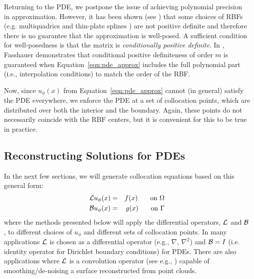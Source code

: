 \documentclass{report}
\begin{document}
{Returning to the PDE, we postpone the issue of  achieving polynomial precision in approximation. However, it has been shown (see \cite{Fasshauer2007, Iske2004}) that some choices of RBFs (e.g. multiquadrics and thin-plate splines \cite{Hon2001}) are not positive definite and therefore there is no guarantee that the approximation is well-posed. A sufficient condition for well-posedness is that the matrix is \emph{conditionally positive definite}. In \cite{Fasshauer2007}, Fasshauer demonstrates that conditional positive definiteness of order $m$ is guaranteed when Equation~\ref{eqn:pde_approx} includes the full polynomial part (i.e., interpolation conditions) to match the order of the RBF. 

Now, since $u_{\phi}(x)$ from Equation~\ref{eqn:pde_approx} cannot (in general) satisfy the PDE everywhere, we enforce the PDE at a set of collocation points, which are  distributed over both the interior and the boundary. Again, these points do not necessarily coincide with the RBF centers, but it is convenient for this to be true in practice. 

\subsection{Reconstructing Solutions for PDEs}
In the next few sections, we will generate collocation equations based on this general form: 
\begin{eqnarray}
\diffop{u_\phi(x)} &=& f(x) \on{\Interior} \label{eqn:colloc_interior}\\ 
\boundop{u_\phi(x)} &=& g(x) \on{\Boundary}  \label{eqn:colloc_boundary} %
\end{eqnarray}
where the methods presented below will apply the differential operators, $\mathcal{L}$ and $\mathcal{B}$, to different choices of $u_\phi$ and different sets of collocation points. In many applications $\mathcal{L}$ is chosen as a differential operator (e.g., $\nabla$, $\nabla^2$) and $\mathcal{B}= I$ (i.e. identity operator for Dirichlet boundary conditions) for PDEs. There are also  applications where $\mathcal{L}$ is a convolution operator (see e.g., \cite{Carr2001, Carr2003}) capable of smoothing/de-noising a surface reconstructed from point clouds. 

}
\end{document}

